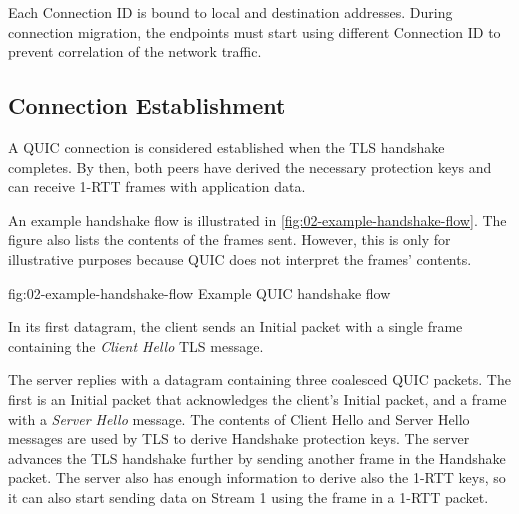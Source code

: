 Each Connection ID is bound to local and destination addresses. During connection migration, the
endpoints must start using different Connection ID to prevent correlation of the network traffic.

\subsection{Connection Establishment}

A QUIC connection is considered established when the TLS handshake completes. By then, both peers
have derived the necessary protection keys and can receive 1-RTT frames with application data.

An example handshake flow is illustrated in \autoref{fig:02-example-handshake-flow}. The figure also
lists the contents of the \CRYPTO{} frames sent. However, this is only for illustrative purposes
because QUIC does not interpret the \CRYPTO{} frames' contents.


\begin{myFigure} {fig:02-example-handshake-flow} {Example QUIC handshake flow}

  \resizebox{\linewidth}{!}{}



\end{myFigure}

In its first datagram, the client sends an Initial packet with a single \CRYPTO{} frame containing the
\textit{Client Hello} TLS message.


The server replies with a datagram containing three coalesced QUIC packets. The first is an Initial
packet that acknowledges the client's Initial packet, and a \CRYPTO{} frame with a \textit{Server
  Hello} message. The contents of Client Hello and Server Hello messages are used by TLS to derive
Handshake protection keys. The server advances the TLS handshake further by sending another
\CRYPTO{} frame in the Handshake packet. The server also has enough information to derive also the
1-RTT keys, so it can also start sending data on Stream 1 using the \STREAM{} frame in a 1-RTT
packet.

